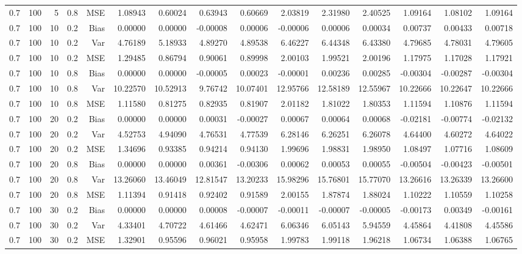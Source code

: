 \begin{table}[!htbp]
\begin{tabular}{lrrrrrrrrrrrrrr}
0.7 & 100 &  5 & 0.8 & MSE & 1.08943 & 0.60024 & 0.63943 & 0.60669 & 2.03819 & 2.31980 & 2.40525 & 1.09164 & 1.08102 & 1.09164 \\
0.7 & 100 & 10 & 0.2 & Bias & 0.00000 & 0.00000 & -0.00008 & 0.00006 & -0.00006 & 0.00006 & 0.00034 & 0.00737 & 0.00433 & 0.00718 \\
0.7 & 100 & 10 & 0.2 & Var & 4.76189 & 5.18933 & 4.89270 & 4.89538 & 6.46227 & 6.44348 & 6.43380 & 4.79685 & 4.78031 & 4.79605 \\
0.7 & 100 & 10 & 0.2 & MSE & 1.29485 & 0.86794 & 0.90061 & 0.89998 & 2.00103 & 1.99521 & 2.00196 & 1.17975 & 1.17028 & 1.17921 \\
0.7 & 100 & 10 & 0.8 & Bias & 0.00000 & 0.00000 & -0.00005 & 0.00023 & -0.00001 & 0.00236 & 0.00285 & -0.00304 & -0.00287 & -0.00304 \\
0.7 & 100 & 10 & 0.8 & Var & 10.22570 & 10.52913 & 9.76742 & 10.07401 & 12.95766 & 12.58189 & 12.55967 & 10.22666 & 10.22647 & 10.22666 \\
0.7 & 100 & 10 & 0.8 & MSE & 1.11580 & 0.81275 & 0.82935 & 0.81907 & 2.01182 & 1.81022 & 1.80353 & 1.11594 & 1.10876 & 1.11594 \\
0.7 & 100 & 20 & 0.2 & Bias & 0.00000 & 0.00000 & 0.00031 & -0.00027 & 0.00067 & 0.00064 & 0.00068 & -0.02181 & -0.00774 & -0.02132 \\
0.7 & 100 & 20 & 0.2 & Var & 4.52753 & 4.94090 & 4.76531 & 4.77539 & 6.28146 & 6.26251 & 6.26078 & 4.64400 & 4.60272 & 4.64022 \\
0.7 & 100 & 20 & 0.2 & MSE & 1.34696 & 0.93385 & 0.94214 & 0.94130 & 1.99696 & 1.98831 & 1.98950 & 1.08497 & 1.07716 & 1.08609 \\
0.7 & 100 & 20 & 0.8 & Bias & 0.00000 & 0.00000 & 0.00361 & -0.00306 & 0.00062 & 0.00053 & 0.00055 & -0.00504 & -0.00423 & -0.00501 \\
0.7 & 100 & 20 & 0.8 & Var & 13.26060 & 13.46049 & 12.81547 & 13.20233 & 15.98296 & 15.76801 & 15.77070 & 13.26616 & 13.26339 & 13.26600 \\
0.7 & 100 & 20 & 0.8 & MSE & 1.11394 & 0.91418 & 0.92402 & 0.91589 & 2.00155 & 1.87874 & 1.88024 & 1.10222 & 1.10559 & 1.10258 \\
0.7 & 100 & 30 & 0.2 & Bias & 0.00000 & 0.00000 & 0.00008 & -0.00007 & -0.00011 & -0.00007 & -0.00005 & -0.00173 & 0.00349 & -0.00161 \\
0.7 & 100 & 30 & 0.2 & Var & 4.33401 & 4.70722 & 4.61466 & 4.62471 & 6.06346 & 6.05143 & 5.94559 & 4.45864 & 4.41808 & 4.45586 \\
0.7 & 100 & 30 & 0.2 & MSE & 1.32901 & 0.95596 & 0.96021 & 0.95958 & 1.99783 & 1.99118 & 1.96218 & 1.06734 & 1.06388 & 1.06765 \\

\end{tabular}
\end{table}
